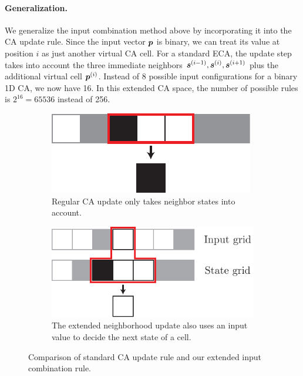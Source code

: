\paragraph{Generalization.} We generalize the input combination method above by
incorporating it into the \ac{CA} update rule. Since the input vector ${\bm{p}}$ is
binary, we can treat its value at position $i$ as just another virtual \ac{CA}
cell. For a standard \ac{ECA}, the update step takes into account the three
immediate neighbors ${\bm{s}}^{(i - 1)}, {\bm{s}}^{(i)}, {\bm{s}}^{(i + 1)}$ plus the
additional virtual cell ${\bm{p}}^{(i)}$. Instead of 8 possible input configurations
for a binary 1D \ac{CA}, we now have 16. In this extended \ac{CA} space, the
number of possible rules is $2^{16} = 65536$ instead of 256.

\begin{figure}[htbp]
  \centering
    \begin{subfigure}[b]{.387\linewidth}
    \centering
    \includegraphics[width=\linewidth]{figures/ca_update_rule.pdf}
    \caption{Regular CA update only takes neighbor states into
      account.}\label{fig:standard-ca-update}
  \end{subfigure}
  \hspace{10pt}
  \begin{subfigure}[b]{.55\linewidth}
    \centering
    \includegraphics[width=\linewidth]{figures/generalized_ca_update_rule.pdf}
    \caption{The extended neighborhood update also uses an input value to
      decide the next state of a cell.}\label{fig:generalized-ca-update}
  \end{subfigure}
  \caption{Comparison of standard CA update rule and our extended input
    combination rule.\label{fig:ca_update_rule}}
\end{figure}

